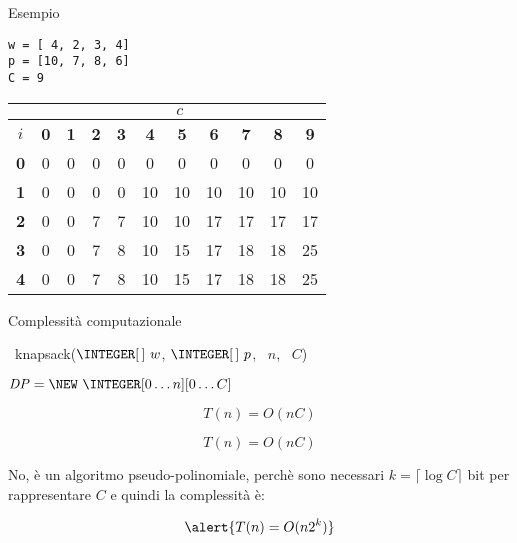 \begin{frame}[fragile]{Esempio}

\vspace{-18pt}
\begin{lstlisting}
w = [ 4, 2, 3, 4]
p = [10, 7, 8, 6]
C = 9  
\end{lstlisting}

\bigskip
\begin{tabular}{|c|c|c|c|c|c|c|c|c|c|c|}
\hline
& \multicolumn{10}{c|}{$c$} \\\hline
$i$ & \textbf{0} & \textbf{1} & \textbf{2} & \textbf{3} & \textbf{4} & \textbf{5} & \textbf{6} & \textbf{7} & \textbf{8} & \textbf{9}  \\\hline
\textbf{0} & 0 &  0 &  0 &  0 &  0 &  0 &  0 &  0 &  0 &  0 \\\hline
\textbf{1} & 0 &  0 &  0 &  0 & 10 & 10 & 10 & 10 & 10 & 10 \\\hline
\textbf{2} & 0 &  0 &  7 &  7 & 10 & 10 & 17 & 17 & 17 & 17 \\\hline
\textbf{3} & 0 &  0 &  7 &  8 & 10 & 15 & 17 & 18 & 18 & 25 \\\hline
\textbf{4} & 0 &  0 &  7 &  8 & 10 & 15 & 17 & 18 & 18 & 25 \\\hline  
\end{tabular}  

\end{frame}

\begin{frame}[fragile]{Complessità computazionale}


\begin{overprint}
\begingroup
\footnotesize
\begin{Procedure}
\caption[A]{\INTEGER\ \textsf{knapsack}($\INTEGER[\,]\ w$, $\INTEGER[\,]\ p$, \INTEGER\ $n$, \INTEGER\ $C$)}

$\mathit{DP} = \NEW\ \INTEGER[0 \ldots n][0 \ldots C]$\;
\;
\end{Procedure}
\endgroup
{}
\[ 
  T(n) = O(nC)
\]


\[ 
  T(n) = O(nC)
\]


\medskip
No, è un algoritmo \alert{pseudo-polinomiale}, perchè sono necessari \alert{$k = \lceil \log C \rceil$} bit
per rappresentare $C$ e quindi la complessità è:

\[
  \alert{T(n) = O(n 2^k) }
\]
\end{overprint}

\end{frame}

